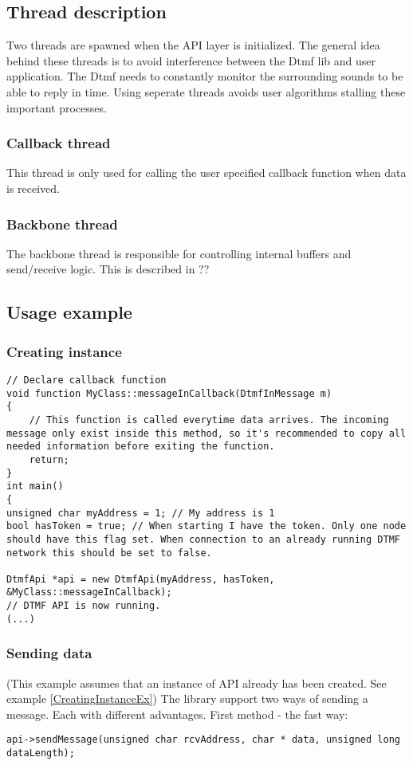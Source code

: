 \subsection{Thread description}
Two threads are spawned when the API layer is initialized. The general idea behind these threads is to avoid interference between the Dtmf lib and user application. The Dtmf needs to constantly monitor the surrounding sounds to be able to reply in time. Using seperate threads avoids user algorithms stalling these important processes.

\subsubsection{Callback thread}
This thread is only used for calling the user specified callback function when data is received. 

\subsubsection{Backbone thread}
The backbone thread is responsible for controlling internal buffers and send/receive logic. This is described in ?? 


\subsection{Usage example}
\subsubsection{Creating instance}
\begin{lstlisting}[float=htb,language={[ANSI]C++},caption={Creating instance example},label=CreatingInstanceEx]
// Declare callback function
void function MyClass::messageInCallback(DtmfInMessage m)
{
    // This function is called everytime data arrives. The incoming message only exist inside this method, so it's recommended to copy all needed information before exiting the function.
    return;
}
int main()
{
unsigned char myAddress = 1; // My address is 1
bool hasToken = true; // When starting I have the token. Only one node should have this flag set. When connection to an already running DTMF network this should be set to false.

DtmfApi *api = new DtmfApi(myAddress, hasToken, &MyClass::messageInCallback);
// DTMF API is now running.
(...)
\end{lstlisting}

\subsubsection{Sending data}
(This example assumes that an instance of API already has been created. See example \ref{CreatingInstanceEx})
The library support two ways of sending a message. Each with different advantages.
First method - the fast way:
\begin{lstlisting}[float=htb,language={[ANSI]C++},caption={Sending data example 1},label=SendingDataEx1]
api->sendMessage(unsigned char rcvAddress, char * data, unsigned long dataLength);
\end{lstlisting}

